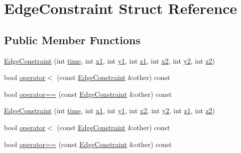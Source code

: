 \hypertarget{struct_edge_constraint}{}\section{Edge\+Constraint Struct Reference}
\label{struct_edge_constraint}
\subsection*{Public Member Functions}
\begin{DoxyCompactItemize}
\item 
\hyperlink{struct_edge_constraint_a9a9f97acb89f2086589a058d8ea10cf8}{Edge\+Constraint} (int \hyperlink{struct_edge_constraint_aa4a694babdcc422c4914ec768994119b}{time}, int \hyperlink{struct_edge_constraint_a71519eb54d966deeed3ac62bfabb6248}{x1}, int \hyperlink{struct_edge_constraint_ada1765ae9a023f4725d515410854efe4}{y1}, int \hyperlink{struct_edge_constraint_aef17564b45f61b8d1112b26fcb2530cc}{z1}, int \hyperlink{struct_edge_constraint_ac586d7c34a6aa83734a860390b99b011}{x2}, int \hyperlink{struct_edge_constraint_a4575744b1bc5386c9195074e73586e96}{y2}, int \hyperlink{struct_edge_constraint_a11aa005fe0bd29b4bf4da5e0429dcba6}{z2})
\item 
bool \hyperlink{struct_edge_constraint_ab34ad90076811f3480434e7446c5c07a}{operator$<$} (const \hyperlink{struct_edge_constraint}{Edge\+Constraint} \&other) const
\item 
bool \hyperlink{struct_edge_constraint_a0bb713ad9bf7afb42e84d85a94656af0}{operator==} (const \hyperlink{struct_edge_constraint}{Edge\+Constraint} \&other) const
\item 
\hyperlink{struct_edge_constraint_a752ce9d7097739927ba5edcd25f617a7}{Edge\+Constraint} (int \hyperlink{struct_edge_constraint_aa4a694babdcc422c4914ec768994119b}{time}, int \hyperlink{struct_edge_constraint_a71519eb54d966deeed3ac62bfabb6248}{x1}, int \hyperlink{struct_edge_constraint_ada1765ae9a023f4725d515410854efe4}{y1}, int \hyperlink{struct_edge_constraint_ac586d7c34a6aa83734a860390b99b011}{x2}, int \hyperlink{struct_edge_constraint_a4575744b1bc5386c9195074e73586e96}{y2}, int \hyperlink{struct_edge_constraint_aef17564b45f61b8d1112b26fcb2530cc}{z1}, int \hyperlink{struct_edge_constraint_a11aa005fe0bd29b4bf4da5e0429dcba6}{z2})
\item 
bool \hyperlink{struct_edge_constraint_ab34ad90076811f3480434e7446c5c07a}{operator$<$} (const \hyperlink{struct_edge_constraint}{Edge\+Constraint} \&other) const
\item 
bool \hyperlink{struct_edge_constraint_a0bb713ad9bf7afb42e84d85a94656af0}{operator==} (const \hyperlink{struct_edge_constraint}{Edge\+Constraint} \&other) const
\end{DoxyCompactItemize}
